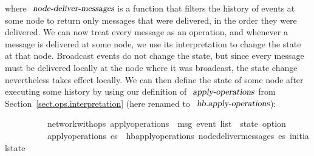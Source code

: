 \vspace{0.375em}
\noindent
where $\isa{node-deliver-messages}$ is a function that filters the history of events at some node to return only messages that were delivered, in the order they were delivered.
We can now treat every message as an operation, and whenever a message is delivered at some node, we use its interpretation to change the state at that node.
Broadcast events do not change the state, but since every message must be delivered locally at the node where it was broadcast, the state change nevertheless takes effect locally.
We can then define the state of some node after executing some history by using our definition of $\isa{apply-operations}$ from Section~\ref{sect.ops.interpretation} (here renamed to $\isa{hb.apply-operations}$):
\vspace{0.375em}
\begin{isabellebody}
\ \ \ \ \ \ \ \ \ {\isacharparenleft}\ network{\isacharunderscore}with{\isacharunderscore}ops{\isacharparenright}\ apply{\isacharunderscore}operations\ {\isacharcolon}{\isacharcolon}\ {\isachardoublequoteopen}{\isacharprime}msg\ event\ list\ {\isasymRightarrow}\ {\isacharprime}state\ option{\isachardoublequoteclose}\ \isanewline
\ \ \ \ \ \ \ \ \ \ {\isachardoublequoteopen}apply{\isacharunderscore}operations\ es\ {\isasymequiv}\ hb{\isachardot}apply{\isacharunderscore}operations\ {\isacharparenleft}node{\isacharunderscore}deliver{\isacharunderscore}messages\ es{\isacharparenright}\ initial{\isacharunderscore}state{\isachardoublequoteclose}
\end{isabellebody}
\vspace{0.375em}

